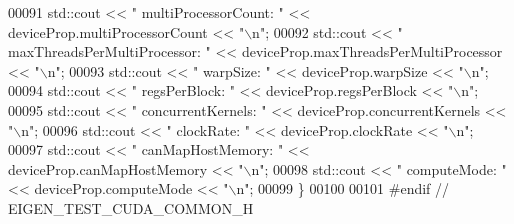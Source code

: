 \begin{DoxyCode}
00091   std::cout << \textcolor{stringliteral}{"  multiProcessorCount:         "} << deviceProp.multiProcessorCount << \textcolor{stringliteral}{"\(\backslash\)n"};
00092   std::cout << \textcolor{stringliteral}{"  maxThreadsPerMultiProcessor: "} << deviceProp.maxThreadsPerMultiProcessor << \textcolor{stringliteral}{"\(\backslash\)n"};
00093   std::cout << \textcolor{stringliteral}{"  warpSize:                    "} << deviceProp.warpSize << \textcolor{stringliteral}{"\(\backslash\)n"};
00094   std::cout << \textcolor{stringliteral}{"  regsPerBlock:                "} << deviceProp.regsPerBlock << \textcolor{stringliteral}{"\(\backslash\)n"};
00095   std::cout << \textcolor{stringliteral}{"  concurrentKernels:           "} << deviceProp.concurrentKernels << \textcolor{stringliteral}{"\(\backslash\)n"};
00096   std::cout << \textcolor{stringliteral}{"  clockRate:                   "} << deviceProp.clockRate << \textcolor{stringliteral}{"\(\backslash\)n"};
00097   std::cout << \textcolor{stringliteral}{"  canMapHostMemory:            "} << deviceProp.canMapHostMemory << \textcolor{stringliteral}{"\(\backslash\)n"};
00098   std::cout << \textcolor{stringliteral}{"  computeMode:                 "} << deviceProp.computeMode << \textcolor{stringliteral}{"\(\backslash\)n"};
00099 \}
00100 
00101 \textcolor{preprocessor}{#endif // EIGEN\_TEST\_CUDA\_COMMON\_H}
\end{DoxyCode}

